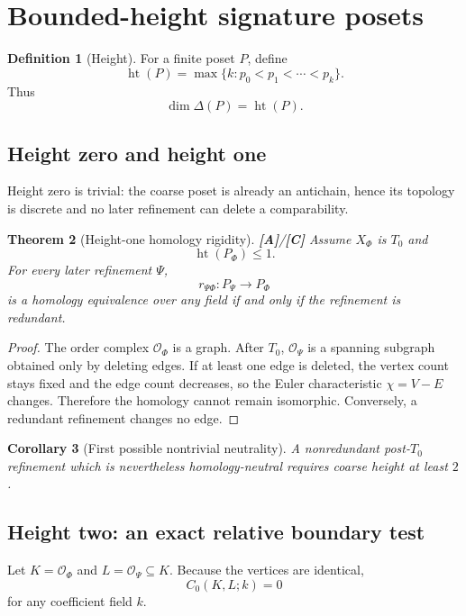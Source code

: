 \documentclass[11pt]{article}
\newtheorem{theorem}{Theorem}[section]
\newtheorem{corollary}[theorem]{Corollary}
\theoremstyle{definition}
\newtheorem{definition}[theorem]{Definition}
\newcommand{\OX}{\mathcal O}
\newcommand{\statusA}{\textbf{[A]}}
\newcommand{\statusC}{\textbf{[C]}}
\begin{document}
\section{Bounded-height signature posets}

\begin{definition}[Height]
For a finite poset $P$, define
\[
\operatorname{ht}(P)=\max\{k:p_0<p_1<\cdots<p_k\}.
\]
Thus
\[
\dim\Delta(P)=\operatorname{ht}(P).
\]
\end{definition}

\subsection{Height zero and height one}

Height zero is trivial: the coarse poset is already an antichain, hence its topology is discrete and no later refinement can delete a comparability.

\begin{theorem}[Height-one homology rigidity]\label{thm:height1}
\statusA/\statusC\;
Assume $X_\Phi$ is $T_0$ and
\[
\operatorname{ht}(P_\Phi)\le1.
\]
For every later refinement $\Psi$,
\[
r_{\Psi\Phi}:P_\Psi\to P_\Phi
\]
is a homology equivalence over any field if and only if the refinement is redundant.
\end{theorem}

\begin{proof}
The order complex $\OX_\Phi$ is a graph. After $T_0$, $\OX_\Psi$ is a spanning subgraph obtained only by deleting edges. If at least one edge is deleted, the vertex count stays fixed and the edge count decreases, so the Euler characteristic $\chi=V-E$ changes. Therefore the homology cannot remain isomorphic. Conversely, a redundant refinement changes no edge.
\end{proof}

\begin{corollary}[First possible nontrivial neutrality]
A nonredundant post-$T_0$ refinement which is nevertheless homology-neutral requires coarse height at least $2$.
\end{corollary}

\subsection{Height two: an exact relative boundary test}

Let $K=\OX_\Phi$ and $L=\OX_\Psi\subseteq K$. Because the vertices are identical,
\[
C_0(K,L;k)=0
\]
for any coefficient field $k$.
\end{document}
